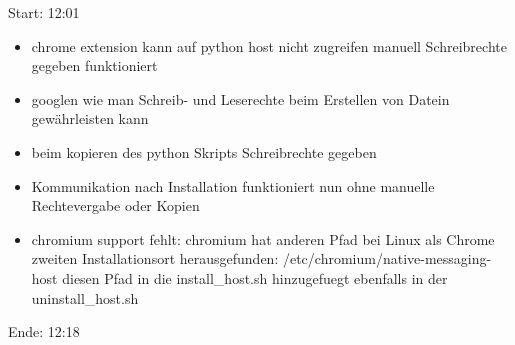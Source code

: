 \documentclass{report}
\begin{document}
Start: 12:01
\begin{itemize}
	\item chrome extension kann auf python host nicht zugreifen
		\subitem manuell Schreibrechte gegeben
		\subitem funktioniert
	\item googlen wie man Schreib- und Leserechte beim Erstellen von Datein gewährleisten kann
	\item beim kopieren des python Skripts Schreibrechte gegeben
	\item Kommunikation nach Installation funktioniert nun ohne manuelle Rechtevergabe oder Kopien

	\item chromium support fehlt:
		\subitem chromium hat anderen Pfad bei Linux als Chrome
		\subitem zweiten Installationsort herausgefunden: /etc/chromium/native-messaging-host
		\subitem diesen Pfad in die install\_host.sh hinzugefuegt
		\subitem ebenfalls in der uninstall\_host.sh
\end{itemize}
Ende: 12:18
\end{document}
